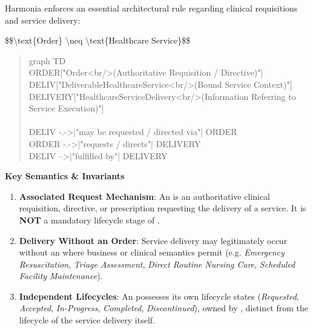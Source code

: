 Harmonia enforces an essential architectural rule regarding clinical requisitions and service delivery:



\$\$\textbackslash{}text\{Order\} \textbackslash{}neq \textbackslash{}text\{Healthcare Service\}\$\$



\begin{quote}\small\ttfamily
graph TD\\
    ORDER["Order<br/>(Authoritative Requisition / Directive)"]\\
    DELIV["DeliverableHealthcareService<br/>(Bound Service Context)"]\\
    DELIVERY["HealthcareServiceDelivery<br/>(Information Referring to Service Execution)"]\\
\\
    DELIV -.->|"may be requested / directed via"| ORDER\\
    ORDER -.->|"requests / directs"| DELIVERY\\
    DELIV -->|"fulfilled by"| DELIVERY\\

\end{quote}


\par\medskip\textbf{Key Semantics \& Invariants}\par


\begin{enumerate}


\item \textbf{Associated Request Mechanism}: An \texttt{} is an authoritative clinical requisition, directive, or prescription requesting the delivery of a service. It is \textbf{NOT} a mandatory lifecycle stage of \texttt{}.

\item \textbf{Delivery Without an Order}: Service delivery may legitimately occur without an \texttt{} where business or clinical semantics permit (e.g. \emph{Emergency Resuscitation}, \emph{Triage Assessment}, \emph{Direct Routine Nursing Care}, \emph{Scheduled Facility Maintenance}).

\item \textbf{Independent Lifecycles}: An \texttt{} possesses its own lifecycle states (\emph{Requested}, \emph{Accepted}, \emph{In-Progress}, \emph{Completed}, \emph{Discontinued}), owned by \texttt{}, distinct from the lifecycle of the service delivery itself.

\end{enumerate}


